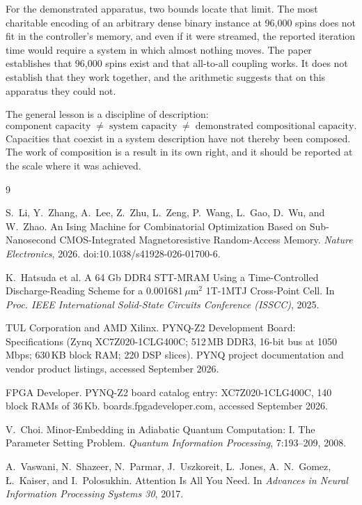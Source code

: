 \documentclass[11pt]{article}
\theoremstyle{definition}
\theoremstyle{remark}
\begin{document}
For the demonstrated apparatus, two bounds locate that limit. The most charitable encoding of an arbitrary dense binary instance at 96,000 spins does not fit in the controller's memory, and even if it were streamed, the reported iteration time would require a system in which almost nothing moves. The paper establishes that 96,000 spins exist and that all-to-all coupling works. It does not establish that they work together, and the arithmetic suggests that on this apparatus they could not.

The general lesson is a discipline of description:
\begin{equation}
\text{component capacity} \;\neq\; \text{system capacity} \;\neq\; \text{demonstrated compositional capacity}.
\end{equation}
Capacities that coexist in a system description have not thereby been composed. The work of composition is a result in its own right, and it should be reported at the scale where it was achieved.

\begin{thebibliography}{9}

S.~Li, Y.~Zhang, A.~Lee, Z.~Zhu, L.~Zeng, P.~Wang, L.~Gao, D.~Wu, and W.~Zhao.
An Ising Machine for Combinatorial Optimization Based on Sub-Nanosecond CMOS-Integrated Magnetoresistive Random-Access Memory.
\emph{Nature Electronics}, 2026. doi:10.1038/s41928-026-01700-6.

K.~Hatsuda et al.
A 64 Gb DDR4 STT-MRAM Using a Time-Controlled Discharge-Reading Scheme for a 0.001681\,$\mu$m$^2$ 1T-1MTJ Cross-Point Cell.
In \emph{Proc. IEEE International Solid-State Circuits Conference (ISSCC)}, 2025.

TUL Corporation and AMD Xilinx.
PYNQ-Z2 Development Board: Specifications (Zynq XC7Z020-1CLG400C; 512\,MB DDR3, 16-bit bus at 1050\,Mbps; 630\,KB block RAM; 220 DSP slices).
PYNQ project documentation and vendor product listings, accessed September 2026.

FPGA Developer.
PYNQ-Z2 board catalog entry: XC7Z020-1CLG400C, 140 block RAMs of 36\,Kb.
boards.fpgadeveloper.com, accessed September 2026.

V.~Choi.
Minor-Embedding in Adiabatic Quantum Computation: I. The Parameter Setting Problem.
\emph{Quantum Information Processing}, 7:193--209, 2008.

A.~Vaswani, N.~Shazeer, N.~Parmar, J.~Uszkoreit, L.~Jones, A.~N.~Gomez, {\L}.~Kaiser, and I.~Polosukhin.
Attention Is All You Need.
In \emph{Advances in Neural Information Processing Systems 30}, 2017.

\end{thebibliography}
\end{document}
